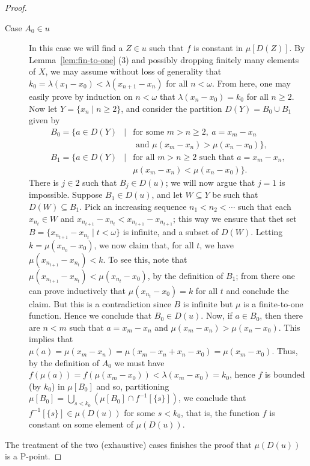 \documentclass{amsart}
\theoremstyle{definition}
\theoremstyle{remark}
\numberwithin{equation}{section}
\begin{document}
\begin{proof}
\begin{description}
\item[Case $A_0\in u$] In this case we will find a $Z\in u$ such that $f$ is constant in $\mu[D(Z)]$. By Lemma~\ref{lem:fin-to-one} (3) and possibly dropping finitely many elements of $X$, we may assume without loss of generality that $k_0=\lambda(x_1-x_0)<\lambda(x_{n+1}-x_n)$ for all $n<\omega$. From here, one may easily prove by induction on $n<\omega$ that $\lambda(x_n-x_0)=k_0$ for all $n\geq 2$. Now let $Y=\{x_n \mid n\geq 2\}$, and consider the partition $D(Y)=B_0\cup B_1$ given by
\begin{eqnarray*}
    B_0=\big\{a\in D(Y) & \mid & \text{for some } m>n\geq 2,\ a=x_m-x_n \\
    & & \text{ and }\mu(x_m-x_n)>\mu(x_n-x_0)\big\}, \\
    B_1=\big\{a\in D(Y) & \mid & \text{for all } m>n\geq 2\text{ such that }a=x_m-x_n, \\
    & & \mu(x_m-x_n)<\mu(x_n-x_0)\big\}. 
\end{eqnarray*}
There is $j\in 2$ such that $B_j\in D(u)$; we will now argue that $j=1$ is impossible. Suppose $B_1\in D(u)$, and let $W\subseteq Y$ be such that $D(W)\subseteq B_1$. Pick an increasing sequence $n_1<n_2<\cdots$ such that each $x_{n_t}\in W$ and $x_{n_{t+1}}-x_{n_t}<x_{n_{t+1}}-x_{n_{t+1}}$; this way we ensure that thet set $B=\{x_{n_{t+1}}-x_{n_t} \mid t<\omega\}$ is infinite, and a subset of $D(W)$. Letting $k=\mu(x_{n_0}-x_0)$, we now claim that, for all $t$, we have $\mu(x_{n_{t+1}}-x_{n_t})<k$. To see this, note that $\mu(x_{n_{t+1}}-x_{n_t})<\mu(x_{n_t}-x_0)$, by the definition of $B_1$; from there one can prove inductively that $\mu(x_{n_t}-x_0)=k$ for all $t$ and conclude the claim. But this is a contradiction since $B$ is infinite but $\mu$ is a finite-to-one function. Hence we conclude that $B_0\in D(u)$. Now, if $a\in B_0$, then there are $n<m$ such that $a=x_m-x_n$ and $\mu(x_m-x_n)>\mu(x_n-x_0)$. This implies that $\mu(a)=\mu(x_m-x_n)=\mu(x_m-x_n+x_n-x_0)=\mu(x_m-x_0)$. Thus, by the definition of $A_0$ we must have $f(\mu(a))=f(\mu(x_m-x_0))<\lambda(x_m-x_0)=k_0$, hence $f$ is bounded (by $k_0$) in $\mu[B_0]$ and so, partitioning $\mu[B_0]=\bigcup_{s<k_0}(\mu[B_0]\cap f^{-1}[\{s\}])$, we conclude that $f^{-1}[\{s\}]\in \mu(D(u))$ for some $s<k_0$, that is, the function $f$ is constant on some element of $\mu(D(u))$.
\end{description}
The treatment of the two (exhaustive) cases finishes the proof that $\mu(D(u))$ is a P-point.
\end{proof}
\end{document}
